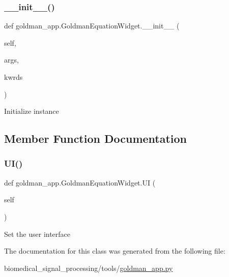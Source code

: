 \subsubsection{\texorpdfstring{\+\_\+\+\_\+init\+\_\+\+\_\+()}{\_\_init\_\_()}}
{\footnotesize\ttfamily def goldman\+\_\+app.\+Goldman\+Equation\+Widget.\+\_\+\+\_\+init\+\_\+\+\_\+ (\begin{DoxyParamCaption}\item[{}]{self,  }\item[{}]{args,  }\item[{}]{kwrds }\end{DoxyParamCaption})}

\begin{DoxyVerb}Initialize instance
\end{DoxyVerb}
 

\subsection{Member Function Documentation}
\mbox{\label{classgoldman__app_1_1GoldmanEquationWidget_a0366838001fc830f1075d78ffd3c99c2}} 
\subsubsection{\texorpdfstring{U\+I()}{UI()}}
{\footnotesize\ttfamily def goldman\+\_\+app.\+Goldman\+Equation\+Widget.\+UI (\begin{DoxyParamCaption}\item[{}]{self }\end{DoxyParamCaption})}

\begin{DoxyVerb}Set the user interface
\end{DoxyVerb}
 

The documentation for this class was generated from the following file\+:\begin{DoxyCompactItemize}
\item 
biomedical\+\_\+signal\+\_\+processing/tools/\hyperlink{goldman__app_8py}{goldman\+\_\+app.\+py}\end{DoxyCompactItemize}
